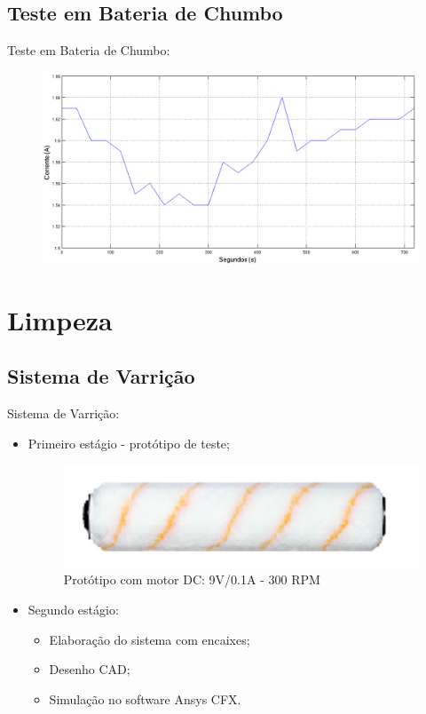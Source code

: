 \documentclass{beamer}
\begin{document}
\subsection{Teste em Bateria de Chumbo}
\begin{frame}
  Teste em Bateria de Chumbo:
        \begin{figure}
          \centering
          \includegraphics[width=1\linewidth]{energia_2}
        \end{figure}
\end{frame}

\section{Limpeza}
\subsection{Sistema de Varrição}
\begin{frame}
  Sistema de Varrição:
    \begin{itemize}
        \item Primeiro estágio - protótipo de teste;
        \begin{figure}
          \centering
          \includegraphics[width=0.8\linewidth]{limpeza_1}
          \caption{Protótipo com motor DC: 9V/0.1A - 300 RPM}
        \end{figure}
        \item Segundo estágio:
        \begin{itemize}
          \item Elaboração do sistema com encaixes;
          \item Desenho CAD;
          \item Simulação no software Ansys CFX.
        \end{itemize}
    \end{itemize}
\end{frame}
\end{document}
